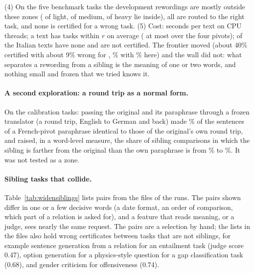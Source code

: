 (4) On the five benchmark tasks the development rewordings are mostly outside these zones (\WidenSentBenchLightZone{} of \WidenSentBenchN{} light, \WidenSentBenchMediumZone{} of \WidenSentBenchN{} medium, \WidenSentBenchHeavyZone{} of \WidenSentBenchN{} heavy lie inside), all are routed to the right task, and none is certified for a wrong task. (5) Cost: \WidenSentSeconds{} seconds per text on \WidenSentThreads{} CPU threads; a text has \WidenSentWithinMean{} tasks within $r$ on average (\WidenSentMax{} at most over the four pivots); \WidenSentNoneIt{} of the \WidenTasksEval{} Italian texts have none and are not certified. The frontier moved (about 40\% certified with about 9\% wrong for \cert{}, \WidenSentItP{}\% with \WidenSentItM{}\% here) and the wall did not: what separates a rewording from a sibling is the meaning of one or two words, and nothing small and frozen that we tried knows it.

\paragraph{A second exploration: a round trip as a normal form.} On the calibration tasks: passing the original and its paraphrase through a frozen translator (a round trip, English to German and back) made \WidenExploreRoundTripIdentical{}\% of the sentences of a French-pivot paraphrase identical to those of the original's own round trip, and raised, in a word-level measure, the share of sibling comparisons in which the sibling is farther from the original than the own paraphrase is from \WidenExploreRoundTripFarFrom{}\% to \WidenExploreRoundTripFarTo{}\%. It was not tested as a zone.

\paragraph{Sibling tasks that collide.} Table~\ref{tab:widensiblings} lists pairs from the files of
the runs. The pairs shown differ in one or a few decisive words (a date format, an
order of comparison, which part of a relation is asked for), and a feature that reads meaning, or a judge,
sees nearly the same request. The pairs are a selection by hand; the lists in the files also hold wrong certificates between tasks that are not siblings, for example
sentence generation from a relation for an entailment task (judge score 0.47), option generation for a physics-style question for a gap classification task (0.68), and gender criticism for offensiveness (0.74).

